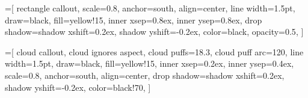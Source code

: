 \RequirePackage{tikz}

\usetikzlibrary{%
  positioning, calc, fit, backgrounds, shadows,%
  arrows.meta,%
  shapes, shapes.geometric, shapes.callouts, shapes.misc,%
}


%


\newcommand\tikzmark[1]{\tikz[remember picture, overlay] \node[anchor=south] (#1) {};}%


=[%
  rectangle callout,%
  scale=0.8,%
  anchor=south,%
  align=center,%
  line width=1.5pt, draw=black, fill=yellow!15, inner xsep=0.8ex, inner ysep=0.8ex,%
  drop shadow={shadow xshift=0.2ex, shadow yshift=-0.2ex, color=black, opacity=0.5},%
]

=[%
  cloud callout, cloud ignores aspect, cloud puffs=18.3, cloud puff arc=120,%
  line width=1.5pt, draw=black, fill=yellow!15, inner xsep=0.2ex, inner ysep=0.4ex,%
  scale=0.8,%
  anchor=south,%
  align=center,%
  drop shadow={shadow xshift=0.2ex, shadow yshift=-0.2ex, color=black!70},%
]

%
